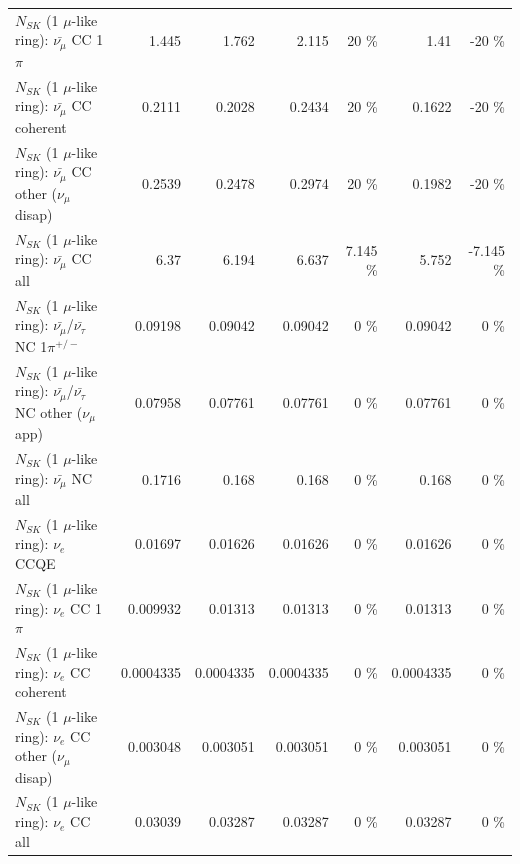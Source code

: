 \begin{table}
\begin{tabular}{| l | r | r | r  r | r  r |}
                         $N_{SK}$ (1 $\mu$-like ring): $\bar{\nu_\mu}$ CC 1$\pi$ &           1.445 &           1.762 &           2.115 &       20 \%  &            1.41 &      -20 \%  \\ 
                       $N_{SK}$ (1 $\mu$-like ring): $\bar{\nu_\mu}$ CC coherent &          0.2111 &          0.2028 &          0.2434 &       20 \%  &          0.1622 &      -20 \%  \\ 
        $N_{SK}$ (1 $\mu$-like ring): $\bar{\nu_\mu}$ CC other ($\nu_\mu$ disap) &          0.2539 &          0.2478 &          0.2974 &       20 \%  &          0.1982 &      -20 \%  \\ 
                          $N_{SK}$ (1 $\mu$-like ring): $\bar{\nu_{\mu}}$ CC all &            6.37 &           6.194 &           6.637 &    7.145 \%  &           5.752 &   -7.145 \%  \\ 
\hline
  $N_{SK}$ (1 $\mu$-like ring): $\bar{\nu_\mu}$/$\bar{\nu_\tau}$ NC 1$\pi^{+/-}$ &         0.09198 &         0.09042 &         0.09042 &        0 \%  &         0.09042 &        0 \%  \\ 
$N_{SK}$ (1 $\mu$-like ring): $\bar{\nu_\mu}$/$\bar{\nu_\tau}$ NC other ($\nu_\mu$ app) &         0.07958 &         0.07761 &         0.07761 &        0 \%  &         0.07761 &        0 \%  \\ 
                          $N_{SK}$ (1 $\mu$-like ring): $\bar{\nu_{\mu}}$ NC all &          0.1716 &           0.168 &           0.168 &        0 \%  &           0.168 &        0 \%  \\ 
\hline
\hline
\hline
                                      $N_{SK}$ (1 $\mu$-like ring): $\nu_e$ CCQE &         0.01697 &         0.01626 &         0.01626 &        0 \%  &         0.01626 &        0 \%  \\ 
                                 $N_{SK}$ (1 $\mu$-like ring): $\nu_e$ CC 1$\pi$ &        0.009932 &         0.01313 &         0.01313 &        0 \%  &         0.01313 &        0 \%  \\ 
                               $N_{SK}$ (1 $\mu$-like ring): $\nu_e$ CC coherent &       0.0004335 &       0.0004335 &       0.0004335 &        0 \%  &       0.0004335 &        0 \%  \\ 
                $N_{SK}$ (1 $\mu$-like ring): $\nu_e$ CC other ($\nu_\mu$ disap) &        0.003048 &        0.003051 &        0.003051 &        0 \%  &        0.003051 &        0 \%  \\ 
                                  $N_{SK}$ (1 $\mu$-like ring): $\nu_{e}$ CC all &         0.03039 &         0.03287 &         0.03287 &        0 \%  &         0.03287 &        0 \%  \\ 

\end{tabular}
\end{table}
